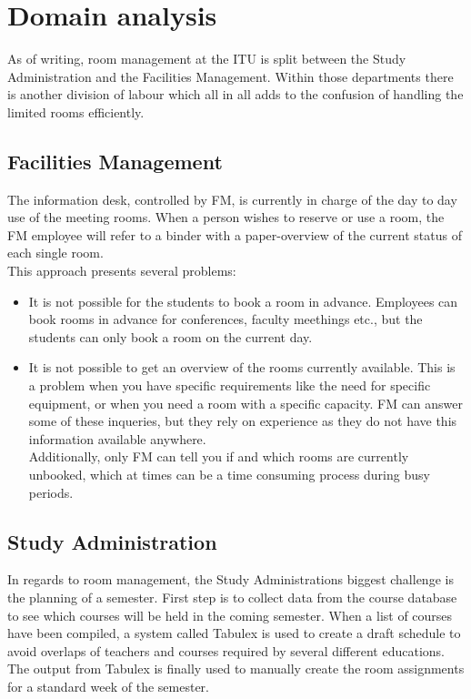 \pagebreak
\section{Domain analysis}
\label{sec:domain_analysis}
As of writing, room management at the ITU is split between the Study Administration and the Facilities Management. Within those departments there is another division of labour which all in all adds to the confusion of handling the limited rooms efficiently.

\subsection{Facilities Management}
The information desk, controlled by FM, is currently in charge of the day to day use of the meeting rooms. When a person wishes to reserve or use a room, the FM employee will refer to a binder with a paper-overview of the current status of each single room.\\

This approach presents several problems:
\begin{itemize}
	\item It is not possible for the students to book a room in advance. Employees can book rooms in advance for conferences, faculty meethings etc., but the students can only book a room on the current day.
	\item It is not possible to get an overview of the rooms currently available. This is a problem when you have specific requirements like the need for specific equipment, or when you need a room with a specific capacity. FM can answer some of these inqueries, but they rely on experience as they do not have this information available anywhere.\\ Additionally, only FM can tell you if and which rooms are currently unbooked, which at times can be a time consuming process during busy periods.
\end{itemize}

\subsection{Study Administration}
In regards to room management, the Study Administrations biggest challenge is the planning of a semester. First step is to collect data from the course database to see which courses will be held in the coming semester. When a list of courses have been compiled, a system called Tabulex is used to create a draft schedule to avoid overlaps of teachers and courses required by several different educations. The output from Tabulex is finally used to manually create the room assignments for a standard week of the semester.


